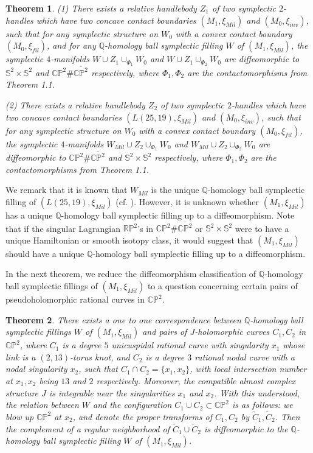 \documentclass[11pt]{amsart}
\theoremstyle{plain}
\newtheorem{theorem}{Theorem}
\numberwithin{theorem}{section}
\theoremstyle{definition}
\newcommand{\C}{{\mathbb C}}
\newcommand{\R}{{\mathbb R}}
\newcommand{\Q}{{\mathbb Q}}
\renewcommand{\P}{{\mathbb P}}
\newcommand{\s}{{\mathbb S}}
\begin{document}
\begin{theorem}
(1) There exists a relative handlebody $Z_1$ of two symplectic $2$-handles which have two concave
contact boundaries $(M_1,\xi_{Mil})$ and $(M_0,\xi_{inv})$, such that for any symplectic structure on $W_0$ 
with a convex contact boundary $(M_0,\xi_{fil})$, and for any $\Q$-homology ball symplectic filling $W$ of 
$(M_1,\xi_{Mil})$, the symplectic $4$-manifolds $W\cup Z_1\cup_{\Phi_1} W_0$ and 
$W\cup Z_1\cup_{\Phi_2} W_0$ are diffeomorphic to $\s^2\times \s^2$  and $\C\P^2\# \overline{\C\P^2}$ respectively, where $\Phi_1,\Phi_2$ are the contactomorphisms from Theorem 1.1.

(2) There exists a relative handlebody $Z_2$ of two symplectic $2$-handles which have two concave
contact boundaries $(L(25,19),\xi_{Mil})$ and $(M_0,\xi_{inv})$, such that for any symplectic structure 
on $W_0$ with a convex contact boundary $(M_0,\xi_{fil})$, the symplectic $4$-manifolds $W_{Mil}\cup Z_2\cup_{\Phi_1} W_0$ and $W_{Mil}\cup Z_2\cup_{\Phi_2} W_0$ are diffeomorphic to 
$\C\P^2\# \overline{\C\P^2}$ and $\s^2\times \s^2$ respectively, where $\Phi_1,\Phi_2$ are the 
contactomorphisms from Theorem 1.1.
\end{theorem}

We remark that it is known that $W_{Mil}$ is the unique $\Q$-homology ball symplectic filling of 
$(L(25,19),\xi_{Mil})$ (cf. \cite{ER}). However, it is unknown whether $(M_1,\xi_{Mil})$ has a unique $\Q$-homology ball symplectic filling up to a diffeomorphism. Note that if the singular Lagrangian $\R\P^2$'s in $\C\P^2\# \overline{\C\P^2}$ or $\s^2\times \s^2$ were to have a unique Hamiltonian or smooth isotopy class, it would suggest 
that $(M_1,\xi_{Mil})$ should have a unique $\Q$-homology ball symplectic filling up to a diffeomorphism.


In the next theorem, we reduce the diffeomorphism classification of $\Q$-homology ball symplectic 
fillings of $(M_1,\xi_{Mil})$ to a question concerning certain pairs of pseudoholomorphic rational curves in $\C\P^2$.

\begin{theorem}
There exists a one to one correspondence between $\Q$-homology ball symplectic fillings $W$ of 
$(M_1,\xi_{Mil})$ and pairs of $J$-holomorphic curves $C_1,C_2$ in $\C\P^2$, where $C_1$ is
a degree $5$ unicuspidal rational curve with singularity $x_1$ whose link is a $(2,13)$-torus knot,
and $C_2$ is a degree $3$ rational nodal curve with a nodal singularity $x_2$, such that 
$C_1\cap C_2=\{x_1,x_2\}$, with local intersection number at $x_1,x_2$ being $13$ and $2$
respectively. Moreover, the compatible almost complex structure $J$ is integrable near the singularities 
$x_1$ and $x_2$. With this understood, the relation between $W$ and the configuration 
$C_1\cup C_2\subset \C\P^2$ is as follows: we blow up $\C\P^2$ at $x_2$, 
and denote the proper transforms of $C_1,C_2$ by $\tilde{C}_1,\tilde{C}_2$. Then the complement of 
a regular neighborhood of $\tilde{C}_1\cup \tilde{C}_2$ is diffeomorphic to the $\Q$-homology ball symplectic 
filling $W$ of $(M_1,\xi_{Mil})$.
\end{theorem}
\end{document}
